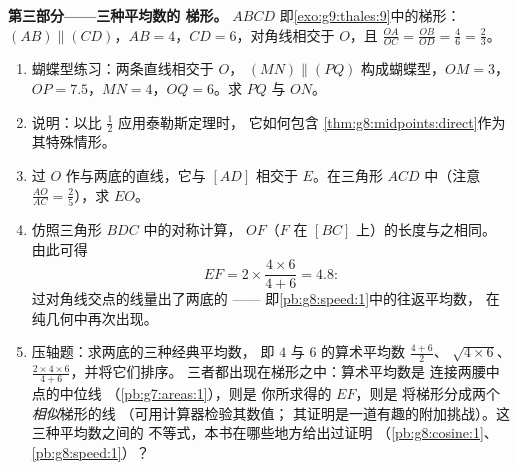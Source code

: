 \begin{problem}
\medskip
\noindent\textbf{第三部分——三种平均数的
梯形。}
$ABCD$ 即\cref{exo:g9:thales:9}中的梯形：
$(AB) \parallel (CD)$，$AB = 4$，$CD = 6$，对角线相交于
$O$，且 $\frac{OA}{OC} = \frac{OB}{OD} = \frac{4}{6} =
\frac23$。
\begin{enumerate}[resume]
  \item 蝴蝶型练习：两条直线相交于 $O$，
        $(MN) \parallel (PQ)$ 构成蝴蝶型，$OM = 3$，
        $OP = 7.5$，$MN = 4$，$OQ = 6$。求 $PQ$ 与
        $ON$。
  \item 说明：以比 $\frac12$ 应用泰勒斯定理时，
        它如何包含
        \cref{thm:g8:midpoints:direct}作为其特殊情形。
  \item 过 $O$ 作与两底的直线，它与
        $[AD]$ 相交于 $E$。在三角形 $ACD$ 中（注意
        $\frac{AO}{AC} = \frac25$），求 $EO$。
  \item 仿照三角形 $BDC$ 中的对称计算，
         $OF$（$F$ 在 $[BC]$ 上）的长度与之相同。
        由此可得
        \[
        EF = 2 \times \frac{4 \times 6}{4 + 6} = 4.8 :
        \]
        过对角线交点的线量出了两底的
        \emph{}——
        即\cref{pb:g8:speed:1}中的往返平均数，
        在纯几何中再次出现。
  \item 压轴题：求两底的三种经典平均数，
        即 $4$ 与 $6$ 的算术平均数
        $\frac{4+6}{2}$、 $\sqrt{4 \times 6}$、
        $\frac{2 \times 4 \times 6}{4 + 6}$，并将它们排序。
        三者都出现在梯形之中：算术平均数是
        连接两腰中点的中位线
        （\cref{pb:g7:areas:1}），则是
        你所求得的 $EF$，则是
        将梯形分成两个\emph{相似}梯形的线
        （可用计算器检验其数值；
        其证明是一道有趣的附加挑战）。这三种平均数之间的
        不等式，本书在哪些地方给出过证明
        （\cref{pb:g8:cosine:1}、\cref{pb:g8:speed:1}）？
\end{enumerate}
\end{problem}
